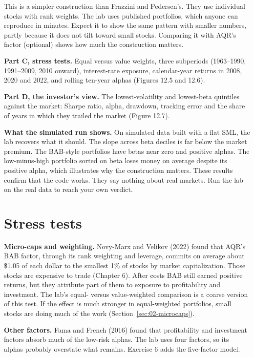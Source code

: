 This is a simpler construction than Frazzini and Pedersen's. They use individual stocks with rank weights. The lab uses published portfolios, which anyone can reproduce in minutes. Expect it to show the same pattern with smaller numbers, partly because it does not tilt toward small stocks. Comparing it with AQR's factor (optional) shows how much the construction matters.

\textbf{Part C, stress tests.} Equal versus value weights, three subperiods (1963--1990, 1991--2009, 2010 onward), interest-rate exposure, calendar-year returns in 2008, 2020 and 2022, and rolling ten-year alphas (Figures 12.5 and 12.6).

\textbf{Part D, the investor's view.} The lowest-volatility and lowest-beta quintiles against the market: Sharpe ratio, alpha, drawdown, tracking error and the share of years in which they trailed the market (Figure 12.7).

\textbf{What the simulated run shows.} On simulated data built with a flat SML, the lab recovers what it should. The slope across beta deciles is far below the market premium. The BAB-style portfolios have betas near zero and positive alphas. The low-minus-high portfolio sorted on beta loses money on average despite its positive alpha, which illustrates why the construction matters. These results confirm that the code works. They say nothing about real markets. Run the lab on the real data to reach your own verdict.

\section{Stress tests}
\label{sec:12-stress}

\textbf{Micro-caps and weighting.} Novy-Marx and Velikov (2022) found that AQR's BAB factor, through its rank weighting and leverage, commits on average about \$1.05 of each dollar to the smallest 1\% of stocks by market capitalization. Those stocks are expensive to trade (Chapter 6). After costs BAB still earned positive returns, but they attribute part of them to exposure to profitability and investment. The lab's equal- versus value-weighted comparison is a coarse version of this test. If the effect is much stronger in equal-weighted portfolios, small stocks are doing much of the work (Section~\ref{sec:02-microcaps}).

\textbf{Other factors.} Fama and French (2016) found that profitability and investment factors absorb much of the low-risk alphas. The lab uses four factors, so its alphas probably overstate what remains. Exercise 6 adds the five-factor model.

